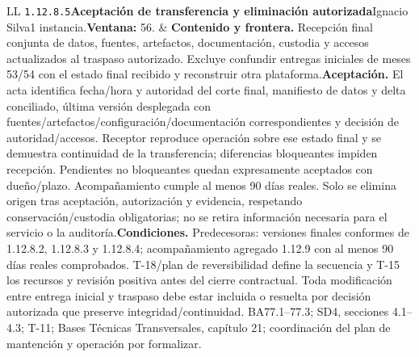 \begin{longtable}{L{\tabcolsep\relax}L{\tabcolsep\relax}}
\texttt{1.\allowbreak{}12.\allowbreak{}8.\allowbreak{}5}\newline{}\textbf{Aceptación de transferencia y eliminación autorizada}\newline{}Ignacio Silva\newline{}1 instancia.\newline{}\textbf{Ventana:} 56. & \textbf{Contenido y frontera.} Recepción final conjunta de datos, fuentes, artefactos, documentación, custodia y accesos actualizados al traspaso autorizado. Excluye confundir entregas iniciales de meses 53/54 con el estado final recibido y reconstruir otra plataforma.\newline{}\textbf{Aceptación.} El acta identifica fecha/hora y autoridad del corte final, manifiesto de datos y delta conciliado, última versión desplegada con fuentes/artefactos/configuración/documentación correspondientes y decisión de autoridad/accesos. Receptor reproduce operación sobre ese estado final y se demuestra continuidad de la transferencia; diferencias bloqueantes impiden recepción. Pendientes no bloqueantes quedan expresamente aceptados con dueño/plazo. Acompañamiento cumple al menos 90 días reales. Solo se elimina origen tras aceptación, autorización y evidencia, respetando conservación/custodia obligatorias; no se retira información necesaria para el servicio o la auditoría.\newline{}\textbf{Condiciones.} Predecesoras: versiones finales conformes de 1.12.8.2, 1.12.8.3 y 1.12.8.4; acompañamiento agregado 1.12.9 con al menos 90 días reales comprobados. T-18/plan de reversibilidad define la secuencia y T-15 los recursos y revisión positiva antes del cierre contractual. Toda modificación entre entrega inicial y traspaso debe estar incluida o resuelta por decisión autorizada que preserve integridad/continuidad. BA77.1--77.3; SD4, secciones 4.1--4.3; T-11; Bases Técnicas Transversales, capítulo 21; coordinación del plan de mantención y operación por formalizar.\\\hline

\end{longtable}
